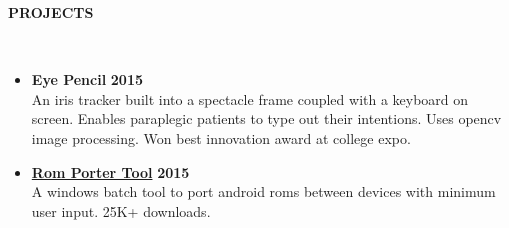 \documentclass[a4paper,10pt]{article}
\newcommand{\lsep}{-0.5cm}
\newcommand{\resheading}[1]{{\small \colorbox{mygrey}{\begin{minipage}{0.975\textwidth}{\textbf{\uppercase{#1} \vphantom{p\^{E}}}}\end{minipage}}}}
\newcommand{\when}[1]{\hfill \textbf{#1}}
\newenvironment{noSepItemize}
{ \begin{itemize}
    \setlength{\itemsep}{1pt}
    \setlength{\parskip}{0pt}
    \setlength{\parsep}{0pt}     }
{ \end{itemize}                  }
\begin{document}
\resheading{\textbf{PROJECTS} }\\[\lsep]
\begin{noSepItemize}
\item \textbf{Eye Pencil} \when{2015}\\
	An iris tracker built into a spectacle frame coupled with a keyboard on screen. Enables paraplegic patients to type out their intentions. Uses opencv image processing. Won best innovation award at college expo.
\item \textbf{\href{http://forum.xda-developers.com/showthread.php?t=2276871}{Rom Porter Tool}} \when{2015}\\
	A windows batch tool to port android roms between devices with minimum user input. 25K+ downloads.
\end{noSepItemize}
\end{document}
